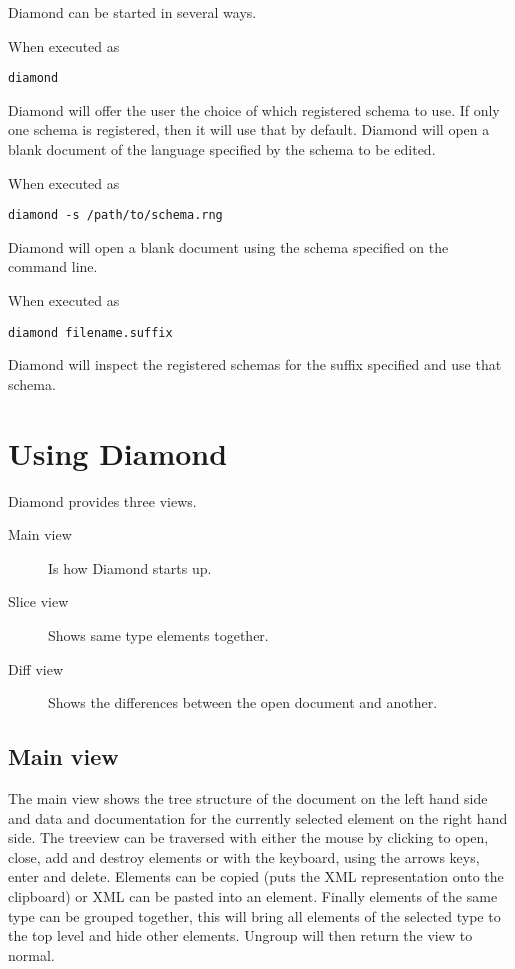 Diamond can be started in several ways.

When executed as
\begin{verbatim}
diamond
\end{verbatim}
Diamond will offer the user the choice of which registered schema to use.
If only one schema is registered, then it will use that by default.
Diamond will open a blank document of the language specified by the schema to be edited.

When executed as
\begin{verbatim}
diamond -s /path/to/schema.rng
\end{verbatim}
Diamond will open a blank document using the schema specified on the command line.

When executed as
\begin{verbatim}
diamond filename.suffix
\end{verbatim}
Diamond will inspect the registered schemas for the suffix specified
and use that schema.

\section{Using Diamond}

Diamond provides three views.
\begin{description}
\item[Main view] Is how Diamond starts up.
\item[Slice view] Shows same type elements together.
\item[Diff view] Shows the differences between the open document and another.
\end{description}

\subsection{Main view}
The main view shows the tree structure of the document on the left hand side and
data and documentation for the currently selected element on the right hand side.
The treeview can be traversed with either the mouse by clicking to open, close, add and 
destroy elements or with the keyboard, using the arrows keys, enter and delete.
Elements can be copied (puts the XML representation onto the clipboard) or XML can be pasted into 
an element.
Finally elements of the same type can be grouped together, this will bring all elements of the selected 
type to the top level and hide other elements. Ungroup will then return the view to normal.

